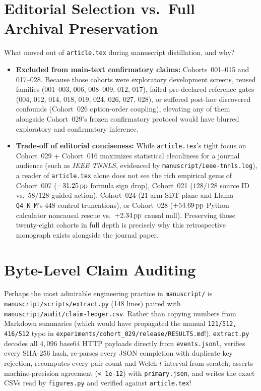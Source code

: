 \section{Editorial Selection vs.\ Full Archival Preservation}
What moved out of \texttt{article.tex} during manuscript distillation, and why?
\begin{itemize}
  \item \textbf{Excluded from main-text confirmatory claims:} Cohorts~001--015 and 017--028. Because those cohorts were exploratory development screens, reused families (001--003, 006, 008--009, 012, 017), failed pre-declared reference gates (004, 012, 014, 018, 019, 024, 026, 027, 028), or suffered post-hoc discovered confounds (Cohort~026 option-order coupling), elevating any of them alongside Cohort~029's frozen confirmatory protocol would have blurred exploratory and confirmatory inference.
  \item \textbf{Trade-off of editorial conciseness:} While \texttt{article.tex}'s tight focus on Cohort~029 + Cohort~016 maximizes statistical cleanliness for a journal audience (such as \emph{IEEE TNNLS}, evidenced by \texttt{manuscript/ieee-tnnls.log}), a reader of \texttt{article.tex} alone does not see the rich empirical gems of Cohort~007 ($-31.25\,\mathrm{pp}$ formula sign drop), Cohort~021 ($128/128$ source ID vs.\ $58/128$ guided action), Cohort~024 ($21$-arm SDT plane and Llama \texttt{Q4\_K\_M}'s $448$ control truncations), or Cohort~028 ($+54.69\,\mathrm{pp}$ Python calculator noncausal rescue vs.\ $+2.34\,\mathrm{pp}$ causal null). Preserving those twenty-eight cohorts in full depth is precisely why this retrospective monograph exists alongside the journal paper.
\end{itemize}

\section{Byte-Level Claim Auditing}
Perhaps the most admirable engineering practice in \texttt{manuscript/} is \texttt{manuscript/scripts/extract.py} (148 lines) paired with \texttt{manuscript/audit/claim-ledger.csv}. Rather than copying numbers from Markdown summaries (which would have propagated the manual \texttt{121/512, 416/512} typo in \texttt{experiments/cohort\_029/release/RESULTS.md}!), \texttt{extract.py} decodes all $4{,}096$ base64 HTTP payloads directly from \texttt{events.jsonl}, verifies every SHA-256 hash, re-parses every JSON completion with duplicate-key rejection, recomputes every pair count and Welch $t$ interval from scratch, asserts machine-precision agreement (\texttt{< 1e-12}) with \texttt{primary.json}, and writes the exact CSVs read by \texttt{figures.py} and verified against \texttt{article.tex}!

